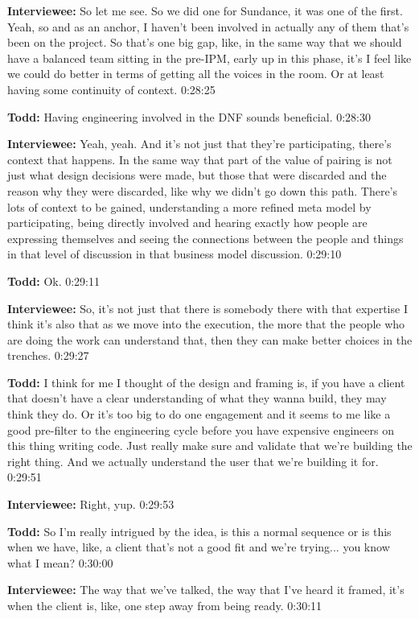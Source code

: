 \textbf{Interviewee:} 	So let me see.  So we did one for Sundance, it was one of the first.  Yeah, so and as an anchor, I haven't been involved in actually any of them that's been on the project.  So that's one big gap, like, in the same way that we should have a balanced team sitting in the pre-IPM, early up in this phase, it's I feel like we could do better in terms of getting all the voices in the room.  Or at least having some continuity of context.  0:28:25

\textbf{Todd:}	  Having engineering involved in the DNF sounds beneficial.  0:28:30

\textbf{Interviewee:}  	Yeah, yeah. And it's not just that they're participating, there's context that happens.  In the same way that part of the value of pairing is not just what design decisions were made, but those that were discarded and the reason why they were discarded, like why we didn't go down this path.  There's lots of context to be gained, understanding a more refined meta model by participating, being directly involved and hearing exactly how people are expressing themselves and seeing the connections between the people and things in that level of discussion in that business model discussion.  0:29:10

\textbf{Todd:}  	Ok.  0:29:11

\textbf{Interviewee:}  	So, it's not just that there is somebody there with that expertise I think it's also that as we move into the execution, the more that the people who are doing the work can understand that, then they can make better choices in the trenches.  0:29:27

\textbf{Todd:}	I think for me I thought of the design and framing is, if you have a client that doesn't have a clear understanding of what they wanna build, they may think they do.  Or it's too big to do one engagement and it seems to me like a good pre-filter to the engineering cycle before you have expensive engineers on this thing writing code.  Just really make sure and validate that we're building the right thing.  And we actually understand the user that we're building it for.  0:29:51

\textbf{Interviewee:}	Right, yup.  0:29:53

\textbf{Todd:}  	So I'm really intrigued by the idea, is this a normal sequence or is this when we have, like, a client that's not a good fit and we're trying... you know what I mean?  0:30:00

\textbf{Interviewee:} 	The way that we've talked, the way that I've heard it framed, it's when the client is, like, one step away from being ready.  0:30:11

